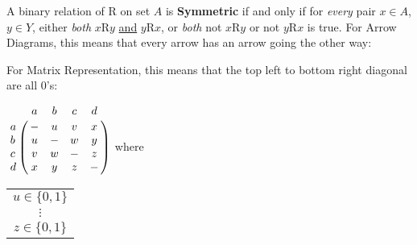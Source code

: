 A binary relation of R on set $A$ is \textbf{Symmetric} if and only if for \textit{every} pair $x \in A$, $y \in Y$,
either \textit{both} $x$R$y$ \underline{and} $y$R$x$, or \textit{both} not $x$R$y$ or not $y$R$x$ is true.
For Arrow Diagrams, this means that every arrow has an arrow going the other way:
\begin{center}
\end{center}
For Matrix Representation, this means that the top left to bottom right diagonal are all 0's:
\begin{center}
  $
    \bordermatrix{ & a & b & c & d \cr
      a & - & u & v & x \cr
      b & u & - & w & y \cr
      c & v & w & - & z \cr
      d & x & y & z & - \cr }
  $
  where
  \begin{tabular}{c}
    $u \in \{0,1\}$ \\
    $\vdots$        \\
    $z \in \{0,1\}$
  \end{tabular}
\end{center}

